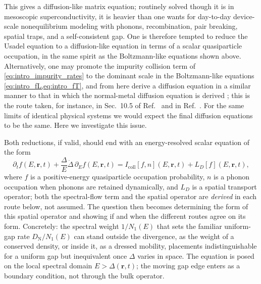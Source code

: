 \documentclass[
  aps,
  prb,
  preprint,
  superscriptaddress,
  longbibliography,
  nofootinbib
]{revtex4-2}
\newcommand{\br}{\mathbf{r}}
\newcommand{\DOS}{N_1}
\newcommand{\DN}{D_{\mathrm{N}}}
\newcommand{\LD}{L_D}
\newcommand{\Icoll}{I_{\mathrm{coll}}}
\begin{document}
This gives a diffusion-like matrix equation; routinely solved though
it is in mesoscopic superconductivity, it is heavier than one wants
for day-to-day device-scale nonequilibrium modeling with phonons,
recombination, pair breaking, spatial traps, and a self-consistent
gap. One is
therefore tempted to reduce the Usadel equation to a diffusion-like
equation in terms of a scalar quasiparticle occupation, in the same spirit as
the Boltzmann-like equations shown above. Alternatively, one may
promote the impurity collision term of
\cref{eq:intro_impurity_rates} to the dominant scale in the
Boltzmann-like equations \cref{eq:intro_fL,eq:intro_fT}, and from
here derive a diffusion equation in a similar manner to that in which
the normal-metal diffusion equation is derived \cite{ziman1960}; this
is the route taken, for instance, in Sec.~10.5 of
Ref.~ and in Ref.~. For
the same limits of identical physical systems we would expect the
final diffusion equations to be the same. Here we investigate this
issue.

Both reductions, if valid, should end with an energy-resolved scalar equation of the form
\begin{equation}
  \partial_t f(E,\br,t)
  + \frac{\Delta}{E}\dot{\Delta}\,\partial_E f(E,\br,t)
  =
  \Icoll[f,n](E,\br,t)
  + \LD[f](E,\br,t),
  \label{eq:intro_scalar_kinetic}
\end{equation}
where \(f\) is a positive-energy quasiparticle occupation probability,
\(n\) is a phonon occupation when phonons are retained dynamically, and
\(\LD\) is a spatial transport operator; both the spectral-flow term
and the spatial operator are \emph{derived} in each route below, not
assumed. The question then becomes determining the form of this
spatial operator and showing if and when the different routes agree on
its form. Concretely: the spectral weight \(1/\DOS(E)\) that sets the
familiar uniform-gap rate \(\DN/\DOS(E)\) can stand outside the
divergence, as the weight of a conserved density, or inside it, as a
dressed mobility, placements indistinguishable for a uniform gap but
inequivalent once \(\Delta\) varies in space. The equation is posed on
the local spectral domain \(E>\Delta(\br,t)\); the moving gap edge
enters as a boundary condition, not through the bulk operator.
\end{document}
